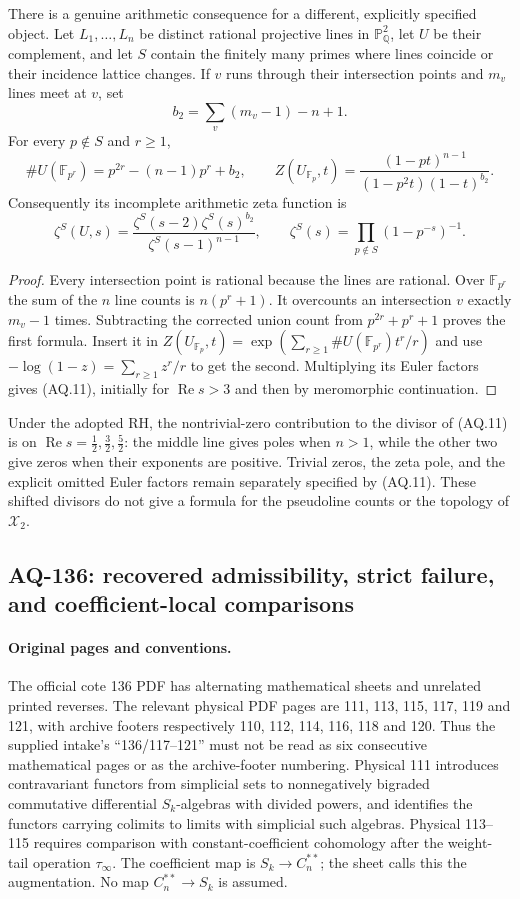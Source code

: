 There is a genuine arithmetic consequence for a
different, explicitly specified object.
Let $L_1,\dots,L_n$ be distinct rational projective
lines in $\mathbb P^2_{\mathbb Q}$, let $U$ be their
complement, and let $S$ contain the finitely many
primes where lines coincide or their incidence
lattice changes. If $v$ runs through their
intersection points and $m_v$ lines meet at $v$, set
\[
 b_2=\sum_v(m_v-1)-n+1.
\]
For every $p\notin S$ and $r\geq1$,
\[
 \#U(\mathbb F_{p^r})=p^{2r}-(n-1)p^r+b_2,\qquad
 Z(U_{\mathbb F_p},t)
  =\frac{(1-pt)^{n-1}}{(1-p^2t)(1-t)^{b_2}}.                  \tag{AQ.10}
\]
Consequently its incomplete arithmetic zeta function is
\[
 \zeta^S(U,s)=
 \frac{\zeta^S(s-2)\zeta^S(s)^{b_2}}
      {\zeta^S(s-1)^{n-1}},\qquad
 \zeta^S(s)=\prod_{p\notin S}(1-p^{-s})^{-1}.                 \tag{AQ.11}
\]
\begin{proof}
Every intersection point is rational because the
lines are rational. Over $\mathbb F_{p^r}$ the sum
of the $n$ line counts is $n(p^r+1)$.
It overcounts an intersection $v$ exactly $m_v-1$
times. Subtracting the corrected union count from
$p^{2r}+p^r+1$ proves the first formula.
Insert it in
$Z(U_{\mathbb F_p},t)=
\exp(\sum_{r\geq1}\#U(\mathbb F_{p^r})t^r/r)$
and use $-\log(1-z)=\sum_{r\geq1}z^r/r$ to get
the second. Multiplying its Euler factors gives
(AQ.11), initially for $\operatorname{Re}s>3$
and then by meromorphic continuation.
\end{proof}
Under the adopted RH, the nontrivial-zero contribution
to the divisor of (AQ.11) is on
$\operatorname{Re}s=\tfrac12,\tfrac32,\tfrac52$:
the middle line gives poles when $n>1$, while the
other two give zeros when their exponents are
positive. Trivial zeros, the zeta pole, and the
explicit omitted Euler factors remain separately
specified by (AQ.11). These shifted divisors do not
give a formula for the pseudoline counts or the
topology of $\mathcal X_2$.

\subsection{AQ-136: recovered admissibility, strict failure, and coefficient-local comparisons}

\paragraph{Original pages and conventions.}
The official cote 136 PDF has alternating mathematical sheets and
unrelated printed reverses.  The relevant physical PDF pages are
111, 113, 115, 117, 119 and 121, with archive footers respectively
110, 112, 114, 116, 118 and 120.  Thus the supplied intake's
``136/117--121'' must not be read as six consecutive mathematical
pages or as the archive-footer numbering.
Physical 111 introduces contravariant functors from simplicial
sets to nonnegatively bigraded commutative differential
$S_k$-algebras with divided powers, and identifies the functors
carrying colimits to limits with simplicial such algebras.
Physical 113--115 requires comparison with constant-coefficient
cohomology after the weight-tail operation $\tau_\infty$.
The coefficient map is $S_k\longrightarrow C_n^{**}$; the sheet
calls this the augmentation.  No map $C_n^{**}\to S_k$ is assumed.

